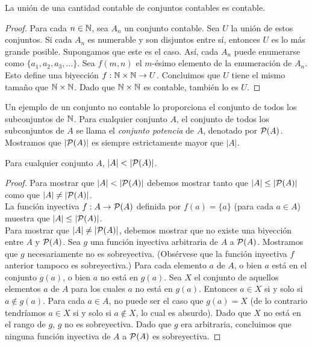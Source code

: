 \message{ !name(main.tex)}\documentclass[12pt,a4paper]{book}
\begin{document}
    \begin{proposicion}\label{prop:union-contable-contable}
        La unión de una cantidad contable de conjuntos contables es contable.
    \end{proposicion}
    \begin{proof}
        Para cada $n\in\mathbb{N}$, sea $A_{n}$ un conjunto contable. Sea $U$ la unión de estos conjuntos. Si cada $A_{n}$ es
        numerable y son disjuntos entre sí, entonces $U$ es lo más grande posible. Supongamos que este es el caso. Así,
        cada $A_{n}$ puede enumerarse como $\{a_{1},a_{2},a_{3},\dots\}$. Sea $f(m,n)$ el $m$-ésimo elemento de la
        enumeración de $A_{n}$. Esto define una biyección $f:\mathbb{N}\times\mathbb{N}\rightarrow U$. Concluimos que $U$ tiene el mismo
        tamaño que $\mathbb{N}\times\mathbb{N}$. Dado que $\mathbb{N}\times\mathbb{N}$ es contable, también lo es $U$.
    \end{proof}

    Un ejemplo de un conjunto no contable lo proporciona el conjunto de todos los subconjuntos de $\mathbb{N}$. Para cualquier
    conjunto $A$, el conjunto de todos los subconjuntos de $A$ se llama el \textit{conjunto potencia} de $A$, denotado por
    $\mathcal{P}(A)$. Mostramos que $|\mathcal{P}(A)|$ es siempre estrictamente mayor que $|A|$.

    \begin{proposicion}\label{prop:potencia-mas-grande}
        Para cualquier conjunto $A$, $|A|<|\PP(A)|$.
    \end{proposicion}
    \begin{proof}
        Para mostrar que $|A|<|\PP(A)|$ debemos mostrar tanto que $|A|\leq|\mathcal{P}(A)|$ como que $|A|\neq|\mathcal{P}(A)|$.\\
        La función inyectiva $f:A\rightarrow\mathcal{P}(A)$ definida por $f(a)=\{a\}$ (para cada $a\in A$) muestra que
        $|A|\leq|\mathcal{P}(A)|$.\\
        Para mostrar que $|A|\neq|\mathcal{P}(A)|$, debemos mostrar que no existe una biyección entre $A$ y $\mathcal{P}(A)$. Sea $g$ una
        función inyectiva arbitraria de $A$ a $\mathcal{P}(A)$. Mostramos que $g$ necesariamente no es sobreyectiva. (Obsérvese que
        la función inyectiva $f$ anterior tampoco es sobreyectiva.) Para cada elemento $a$ de $A$, o bien $a$ está en el
        conjunto $g(a)$, o bien $a$ no está en $g(a)$. Sea $X$ el conjunto de aquellos elementos $a$ de $A$ para los cuales
        $a$ no está en $g(a)$. Entonces $a\in X$ si y solo si $a\notin g(a)$. Para cada $a\in A$, no puede ser el caso que
        $g(a)=X$ (de lo contrario tendríamos $a\in X$ si y solo si $a\notin X$, lo cual es absurdo). Dado que $X$ no está
        en el rango de $g$, $g$ no es sobreyectiva. Dado que $g$ era arbitraria, concluimos que ninguna función inyectiva de
        $A$ a $\mathcal{P}(A)$ es sobreyectiva.
    \end{proof}
\end{document}
